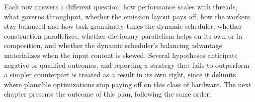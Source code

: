 Each row answers a different question: how performance scales with threads, what
governs throughput, whether the emission layout pays off, how the workers stay
balanced and how task granularity tunes the dynamic scheduler, whether
construction parallelizes, whether dictionary parallelism helps on its own or
in composition, and whether the dynamic scheduler's balancing advantage
materializes when the input content is skewed. Several hypotheses anticipate
negative or qualified outcomes, and reporting a strategy that fails to outperform
a simpler counterpart is treated as a result in its own right, since it delimits
where plausible optimizations stop paying off on this class of hardware. The next
chapter presents the outcome of this plan, following the same order.
